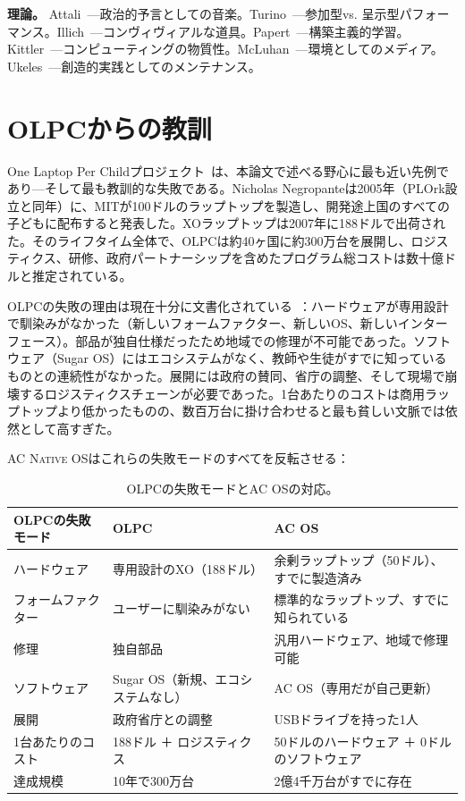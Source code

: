 \documentclass[10pt,letterpaper,twocolumn]{article}
\newcommand{\acos}{\textsc{AC Native OS}}
\begin{document}
\textbf{理論。} Attali~\citep{attali1985noise}---政治的予言としての音楽。Turino~\citep{turino2008music}---参加型vs. 呈示型パフォーマンス。Illich~\citep{illich1973tools}---コンヴィヴィアルな道具。Papert~\citep{papert1980mindstorms}---構築主義的学習。Kittler~\citep{kittler1995no}---コンピューティングの物質性。McLuhan~\citep{mcluhan1964understanding}---環境としてのメディア。Ukeles~\citep{ukeles1969manifesto}---創造的実践としてのメンテナンス。


\section{OLPCからの教訓}
\label{sec:olpc}

One Laptop Per Childプロジェクト~\citep{negroponte1995being, kraemer2009olpc}は、本論文で述べる野心に最も近い先例であり---そして最も教訓的な失敗である。Nicholas Negropanteは2005年（PLOrk設立と同年）に、MITが100ドルのラップトップを製造し、開発途上国のすべての子どもに配布すると発表した。XOラップトップは2007年に188ドルで出荷された。そのライフタイム全体で、OLPCは約40ヶ国に約300万台を展開し、ロジスティクス、研修、政府パートナーシップを含めたプログラム総コストは数十億ドルと推定されている。

OLPCの失敗の理由は現在十分に文書化されている~\citep{kraemer2009olpc}：ハードウェアが専用設計で馴染みがなかった（新しいフォームファクター、新しいOS、新しいインターフェース）。部品が独自仕様だったため地域での修理が不可能であった。ソフトウェア（Sugar OS）にはエコシステムがなく、教師や生徒がすでに知っているものとの連続性がなかった。展開には政府の賛同、省庁の調整、そして現場で崩壊するロジスティクスチェーンが必要であった。1台あたりのコストは商用ラップトップより低かったものの、数百万台に掛け合わせると最も貧しい文脈では依然として高すぎた。

\acos{}はこれらの失敗モードのすべてを反転させる：

\begin{table}[h]
\small
\centering
\begin{tabularx}{\columnwidth}{lXX}
\toprule
\textbf{OLPCの失敗モード} & \textbf{OLPC} & \textbf{AC OS} \\
\midrule
ハードウェア & 専用設計のXO（188ドル） & 余剰ラップトップ（50ドル）、すでに製造済み \\
フォームファクター & ユーザーに馴染みがない & 標準的なラップトップ、すでに知られている \\
修理 & 独自部品 & 汎用ハードウェア、地域で修理可能 \\
ソフトウェア & Sugar OS（新規、エコシステムなし） & AC OS（専用だが自己更新） \\
展開 & 政府省庁との調整 & USBドライブを持った1人 \\
1台あたりのコスト & 188ドル ＋ ロジスティクス & 50ドルのハードウェア ＋ 0ドルのソフトウェア \\
達成規模 & 10年で300万台 & 2億4千万台がすでに存在 \\
\bottomrule
\end{tabularx}
\caption{OLPCの失敗モードとAC OSの対応。}
\label{tab:olpc}
\end{table}
\end{document}
